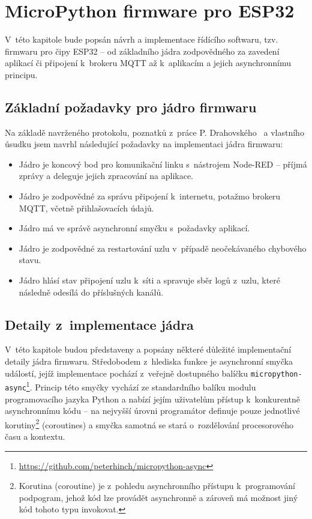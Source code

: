 \chapter{MicroPython firmware pro ESP32}
\label{ch:firmware}

V~této kapitole bude popsán návrh a implementace řídícího softwaru, tzv. firmwaru pro čipy ESP32 -- od základního
jádra zodpovědného za zavedení aplikací či připojení k~brokeru MQTT až k~aplikacím a jejich asynchronnímu principu.

\section{Základní požadavky pro jádro firmwaru}\label{sec:základní-požadavky-pro-jádro}
Na základě navrženého protokolu, poznatků z~práce P. Drahovského~\cite{DrahovskyPeter2017RIun} a vlastního úsudku jsem
navrhl následující požadavky na implementaci jádra firmwaru:

\begin{itemize}
    \item Jádro je koncový bod pro komunikační linku s~nástrojem Node-RED -- příjmá zprávy a deleguje jejich
    zpracování na aplikace.
    \item Jádro je zodpovědné za správu připojení k~internetu, potažmo brokeru MQTT, včetně přihlašovacích údajů.
    \item Jádro má ve správě asynchronní smyčku s~požadavky aplikací.
    \item Jádro je zodpovědné za restartování uzlu v~případě neočekávaného chybového stavu.
    \item Jádro hlásí stav připojení uzlu k~síti a spravuje sběr logů z~uzlu, které následně odesílá do příslušných
    kanálů.
\end{itemize}

\section{Detaily z~implementace jádra}\label{sec:detaily-z-implementace-jadra}
V~této kapitole budou představeny a popsány některé důležité implementační detaily jádra firmwaru.
Středobodem z~hlediska funkce je asynchronní smyčka událostí, jejíž implementace pochází z~veřejně dostupného balíčku
\texttt{micropython-async}\footnote{\url{https://github.com/peterhinch/micropython-async}}.
Princip této smyčky vychází ze standardního balíku modulu  programovacího jazyka Python a nabízí
jejím uživatelům přístup k~konkurentně asynchronnímu kódu -- na nejvyšší úrovni programátor definuje pouze jednotlivé
korutiny\footnote{Korutina (coroutine) je z~pohledu asynchronního přístupu k~programování podpogram,
jehož kód lze provádět asynchronně a zároveň má možnost jiný kód tohoto typu invokovat.} (coroutines) a smyčka samotná
se stará o~rozdělování procesorového času a kontextu.

